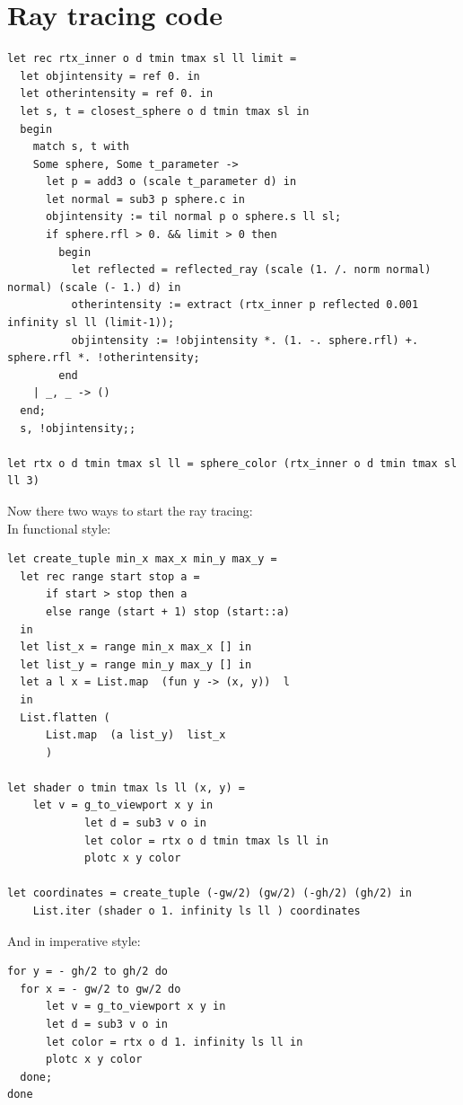 \documentclass[conference]{IEEEtran}
\begin{document}
\section{Ray tracing code}

\begin{lstlisting}
let rec rtx_inner o d tmin tmax sl ll limit =
  let objintensity = ref 0. in 
  let otherintensity = ref 0. in  
  let s, t = closest_sphere o d tmin tmax sl in 
  begin
    match s, t with 
    Some sphere, Some t_parameter ->
      let p = add3 o (scale t_parameter d) in 
      let normal = sub3 p sphere.c in
      objintensity := til normal p o sphere.s ll sl;
      if sphere.rfl > 0. && limit > 0 then
        begin
          let reflected = reflected_ray (scale (1. /. norm normal) normal) (scale (- 1.) d) in 
          otherintensity := extract (rtx_inner p reflected 0.001 infinity sl ll (limit-1));
          objintensity := !objintensity *. (1. -. sphere.rfl) +. sphere.rfl *. !otherintensity;
        end
    | _, _ -> ()
  end; 
  s, !objintensity;;

let rtx o d tmin tmax sl ll = sphere_color (rtx_inner o d tmin tmax sl ll 3)
\end{lstlisting}

Now there two ways to start the ray tracing:\\ 
In functional style:

\begin{lstlisting}
let create_tuple min_x max_x min_y max_y =
  let rec range start stop a = 
      if start > stop then a
      else range (start + 1) stop (start::a)
  in 
  let list_x = range min_x max_x [] in
  let list_y = range min_y max_y [] in 
  let a l x = List.map  (fun y -> (x, y))  l
  in
  List.flatten (
      List.map  (a list_y)  list_x
      )

let shader o tmin tmax ls ll (x, y) = 
    let v = g_to_viewport x y in
            let d = sub3 v o in
            let color = rtx o d tmin tmax ls ll in 
            plotc x y color

let coordinates = create_tuple (-gw/2) (gw/2) (-gh/2) (gh/2) in 
    List.iter (shader o 1. infinity ls ll ) coordinates
\end{lstlisting}

And in imperative style:

\begin{lstlisting}
for y = - gh/2 to gh/2 do 
  for x = - gw/2 to gw/2 do 
      let v = g_to_viewport x y in
      let d = sub3 v o in
      let color = rtx o d 1. infinity ls ll in 
      plotc x y color
  done;
done
\end{lstlisting}
\end{document}
